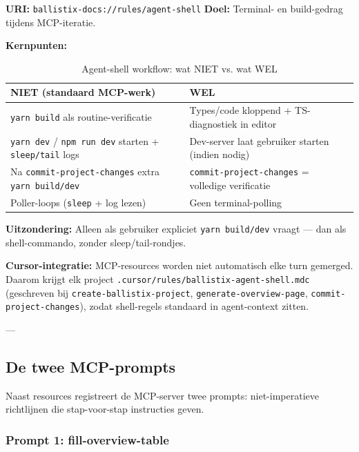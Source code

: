 \noindent
\textbf{URI:} \texttt{ballistix-docs://rules/agent-shell} \newline
\textbf{Doel:} Terminal- en build-gedrag tijdens MCP-iteratie.

\noindent
\textbf{Kernpunten:}

\begin{table}[htbp]
  \centering
  \caption{Agent-shell workflow: wat NIET vs. wat WEL}
  \label{tab:agent-shell-rules}
  \small
  \begin{tabularx}{\textwidth}{|l|l|}
    \hline
    \textbf{NIET (standaard MCP-werk)} & \textbf{WEL} \\
    \hline
    \texttt{yarn build} als routine-verificatie & Types/code kloppend + TS-diagnostiek in editor \\
    \hline
    \texttt{yarn dev} / \texttt{npm run dev} starten + \texttt{sleep/tail} logs & Dev-server laat gebruiker starten (indien nodig) \\
    \hline
    Na \texttt{commit-project-changes} extra \texttt{yarn build/dev} & \texttt{commit-project-changes} = volledige verificatie \\
    \hline
    Poller-loops (\texttt{sleep} + log lezen) & Geen terminal-polling \\
    \hline
  \end{tabularx}
\end{table}

\noindent
\textbf{Uitzondering:} Alleen als gebruiker expliciet \texttt{yarn build/dev} vraagt — dan als shell-commando, zonder sleep/tail-rondjes.

\textbf{Cursor-integratie:} MCP-resources worden niet automatisch elke turn gemerged. Daarom krijgt elk project \texttt{.cursor/rules/ballistix-agent-shell.mdc} (geschreven bij \texttt{create-ballistix-project}, \texttt{generate-overview-page}, \texttt{commit-project-changes}), zodat shell-regels standaard in agent-context zitten.

---

\subsection{De twee MCP-prompts}

Naast resources registreert de MCP-server twee prompts: niet-imperatieve richtlijnen die stap-voor-stap instructies geven.

\subsubsection{Prompt 1: fill-overview-table}

